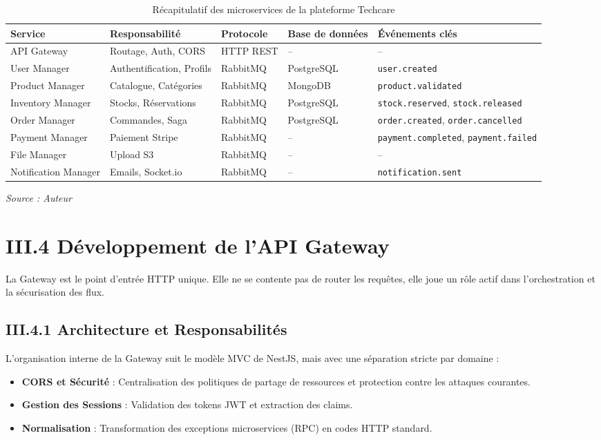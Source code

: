 \begin{table}[H]
    \centering
    \begin{tabular}{|p{2.8cm}|p{2.5cm}|p{2cm}|p{2cm}|p{3.5cm}|}
        \hline
        \textbf{Service} & \textbf{Responsabilité} & \textbf{Protocole} & \textbf{Base de données} & \textbf{Événements clés} \\
        \hline
        API Gateway & Routage, Auth, CORS & HTTP REST & -- & -- \\
        \hline
        User Manager & Authentification, Profils & RabbitMQ & PostgreSQL & \texttt{user.created} \\
        \hline
        Product Manager & Catalogue, Catégories & RabbitMQ & MongoDB & \texttt{product.validated} \\
        \hline
        Inventory Manager & Stocks, Réservations & RabbitMQ & PostgreSQL & \texttt{stock.reserved}, \texttt{stock.released} \\
        \hline
        Order Manager & Commandes, Saga & RabbitMQ & PostgreSQL & \texttt{order.created}, \texttt{order.cancelled} \\
        \hline
        Payment Manager & Paiement Stripe & RabbitMQ & -- & \texttt{payment.completed}, \texttt{payment.failed} \\
        \hline
        File Manager & Upload S3 & RabbitMQ & -- & -- \\
        \hline
        Notification Manager & Emails, Socket.io & RabbitMQ & -- & \texttt{notification.sent} \\
        \hline
    \end{tabular}
    \caption{Récapitulatif des microservices de la plateforme Techcare}
    \vspace{0.2cm}\small\textit{Source : Auteur}
    \label{tab:microservices_recap}
\end{table}

\section{III.4 Développement de l'API Gateway}
\label{sec:gateway_dev}

La Gateway est le point d'entrée HTTP unique. Elle ne se contente pas de router les requêtes, elle joue un rôle actif dans l'orchestration et la sécurisation des flux.

\subsection{III.4.1 Architecture et Responsabilités}
L'organisation interne de la Gateway suit le modèle MVC de NestJS, mais avec une séparation stricte par domaine :
\begin{itemize}
    \item \textbf{CORS et Sécurité} : Centralisation des politiques de partage de ressources et protection contre les attaques courantes.
    \item \textbf{Gestion des Sessions} : Validation des tokens JWT et extraction des claims.
    \item \textbf{Normalisation} : Transformation des exceptions microservices (RPC) en codes HTTP standard.
\end{itemize}

